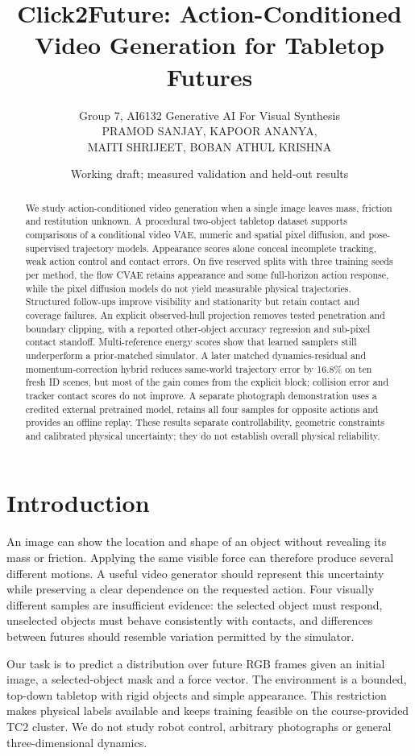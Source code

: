 \documentclass[11pt,a4paper]{article}
\title{Click2Future: Action-Conditioned Video Generation for Tabletop Futures}
\author{Group 7, AI6132 Generative AI For Visual Synthesis\\
\small PRAMOD SANJAY, KAPOOR ANANYA,\\
\small MAITI SHRIJEET, BOBAN ATHUL KRISHNA}
\date{\small Working draft; measured validation and held-out results}
\begin{document}
\maketitle
\begin{abstract}
We study action-conditioned video generation when a single image leaves mass,
friction and restitution unknown. A procedural two-object tabletop dataset
supports comparisons of a conditional video VAE, numeric and spatial pixel
diffusion, and pose-supervised trajectory models. Appearance scores alone
conceal incomplete tracking, weak action control and contact errors. On five
reserved splits with three training seeds per method, the flow CVAE retains
appearance and some full-horizon action response, while the pixel diffusion
models do not yield measurable physical trajectories. Structured follow-ups
improve visibility and stationarity but retain contact and coverage failures.
An explicit observed-hull projection removes tested penetration and boundary
clipping, with a reported other-object accuracy regression and sub-pixel
contact standoff. Multi-reference energy scores show that learned samplers
still underperform a prior-matched simulator. A later matched dynamics-residual
and momentum-correction hybrid reduces same-world trajectory error by 16.8\%
on ten fresh ID scenes, but most of the gain comes from the explicit block;
collision error and tracker contact scores do not improve. A separate
photograph demonstration uses a credited external pretrained model, retains
all four samples for opposite actions and provides an offline replay. These
results separate controllability, geometric constraints and calibrated
physical uncertainty; they do not establish overall physical reliability.
\end{abstract}

\section{Introduction}
An image can show the location and shape of an object without revealing its mass or friction. Applying the same visible force can therefore produce several different motions. A useful video generator should represent this uncertainty while preserving a clear dependence on the requested action. Four visually different samples are insufficient evidence: the selected object must respond, unselected objects must behave consistently with contacts, and differences between futures should resemble variation permitted by the simulator.

Our task is to predict a distribution over future RGB frames given an initial image, a selected-object mask and a force vector. The environment is a bounded, top-down tabletop with rigid objects and simple appearance. This restriction makes physical labels available and keeps training feasible on the course-provided TC2 cluster. We do not study robot control, arbitrary photographs or general three-dimensional dynamics.
\end{document}
